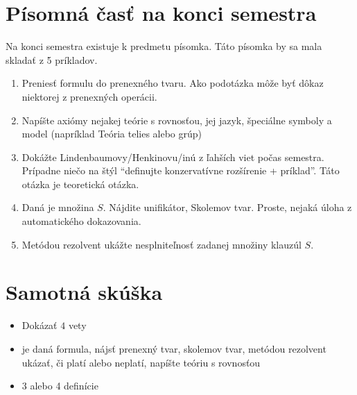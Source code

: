 \section{Písomná časť na konci semestra}

Na konci semestra existuje k predmetu písomka.
Táto písomka by sa mala skladať z 5 príkladov.
\begin{enumerate}
    \item Preniesť formulu do prenexného tvaru. Ako podotázka môže byť
        dôkaz niektorej z prenexných operácii.

    \item Napíšte axiómy nejakej teórie s rovnosťou, jej jazyk,
        špeciálne symboly a model (napríklad Teória telies alebo grúp)

    \item Dokážte Lindenbaumovy/Henkinovu/inú z ľahších viet počas
        semestra. Prípadne niečo na štýl 
        ``definujte konzervatívne rozšírenie + príklad''.
        Táto otázka je teoretická otázka.

    \item Daná je množina $S$. Nájdite unifikátor, Skolemov tvar.
        Proste, nejaká úloha z automatického dokazovania.

    \item Metódou rezolvent ukážte nesplniteľnosť zadanej množiny
        klauzúl $S$.
\end{enumerate}

\section{Samotná skúška}

\startFIXME
\begin{itemize}
	\item Dokázať $4$ vety
	\item je daná formula, nájsť prenexný tvar, skolemov tvar, metódou
	rezolvent ukázať, či platí alebo neplatí, napíšte teóriu s rovnosťou
	\item 3 alebo 4 definície
\end{itemize}
\stopFIXME
